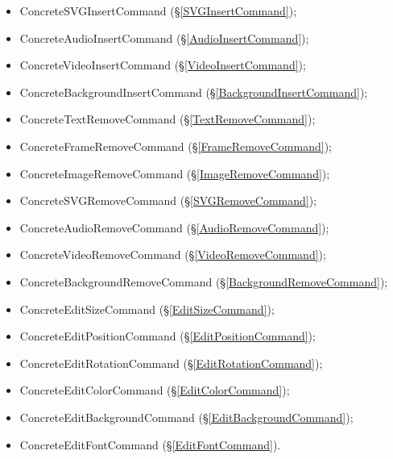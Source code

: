 {{{\begin{itemize}
			\item ConcreteSVGInsertCommand (\S\ref{SVGInsertCommand});
			\item ConcreteAudioInsertCommand (\S\ref{AudioInsertCommand});
			\item ConcreteVideoInsertCommand (\S\ref{VideoInsertCommand});
			\item ConcreteBackgroundInsertCommand (\S\ref{BackgroundInsertCommand});
			\item ConcreteTextRemoveCommand (\S\ref{TextRemoveCommand});
			\item ConcreteFrameRemoveCommand (\S\ref{FrameRemoveCommand});
			\item ConcreteImageRemoveCommand (\S\ref{ImageRemoveCommand});
			\item ConcreteSVGRemoveCommand (\S\ref{SVGRemoveCommand});
			\item ConcreteAudioRemoveCommand (\S\ref{AudioRemoveCommand});
			\item ConcreteVideoRemoveCommand (\S\ref{VideoRemoveCommand});
			\item ConcreteBackgroundRemoveCommand (\S\ref{BackgroundRemoveCommand});
			\item ConcreteEditSizeCommand (\S\ref{EditSizeCommand});
			\item ConcreteEditPositionCommand (\S\ref{EditPositionCommand});
			\item ConcreteEditRotationCommand (\S\ref{EditRotationCommand});
			\item ConcreteEditColorCommand (\S\ref{EditColorCommand});
			\item ConcreteEditBackgroundCommand (\S\ref{EditBackgroundCommand});
			\item ConcreteEditFontCommand (\S\ref{EditFontCommand}).
		\end{itemize}
	}
}}
